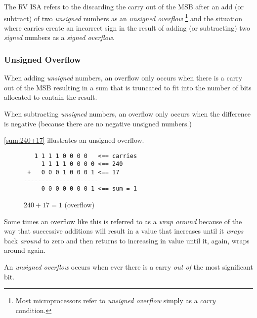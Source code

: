 The RV ISA refers to the discarding the carry out of the MSB after an 
add (or subtract) of two {\em unsigned} numbers as an {\em unsigned overflow}%
\footnote{Most microprocessors refer to {\em unsigned overflow} simply as a 
{\em carry} condition.}
and the situation where carries create an incorrect sign in the
result of adding (or subtracting) two {\em signed} numbers as a
{\em signed overflow}.~\cite[p.~13]{rvismv1v22:2017}

\subsubsection{Unsigned Overflow}

When adding {\em unsigned} numbers, an overflow only occurs when there 
is a carry out of the MSB resulting in a sum that is truncated to fit 
into the number of bits allocated to contain the result.

When subtracting {\em unsigned} numbers, an overflow only occurs when the
difference is negative (because there are no negative unsigned numbers.)

\autoref{sum:240+17} illustrates an unsigned overflow.

\begin{figure}[H]
\centering
\begin{BVerbatim}
   1 1 1 1 0 0 0 0   <== carries
     1 1 1 1 0 0 0 0 <== 240
 +   0 0 0 1 0 0 0 1 <== 17
---------------------
     0 0 0 0 0 0 0 1 <== sum = 1
\end{BVerbatim}
\caption{$240+17=1$ (overflow)}
\label{sum:240+17}
\end{figure}

Some times an overflow like this is referred to as a {\em wrap around}
because of the way that successive additions will result in a value that
increases until it {\em wraps} back {\em around} to zero and then 
returns to increasing in value until it, again, wraps around again.

\begin{tcolorbox}
An {\em unsigned overflow} occurs when ever there is a carry
{\em out of} the most significant bit.
\end{tcolorbox}


